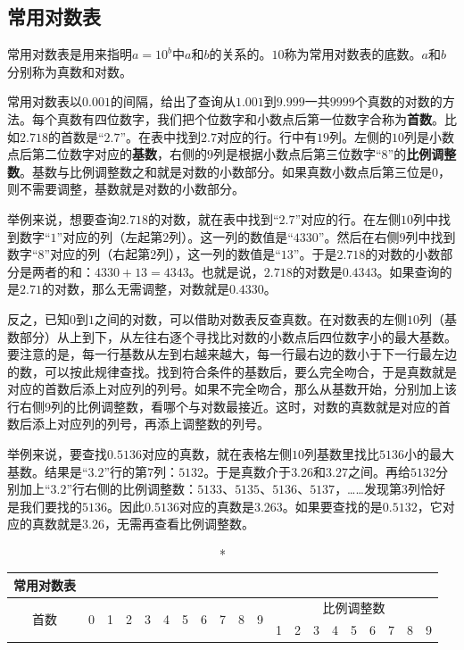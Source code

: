 \documentclass[12pt,UTF8,fontset=none]{ctexbook}
\begin{document}
\begin{appendix}

\chapter{常用对数表}

常用对数表是用来指明$a = 10^b$中$a$和$b$的关系的。$10$称为常用对数表的底数。$a$和$b$分别称为真数和对数。

常用对数表以$0.001$的间隔，给出了查询从$1.001$到$9.999$一共$9999$个真数的对数的方法。每个真数有四位数字，我们把个位数字和小数点后第一位数字合称为\textbf{首数}。比如$2.718$的首数是“$2.7$”。在表中找到$2.7$对应的行。行中有$19$列。左侧的$10$列是小数点后第二位数字对应的\textbf{基数}，右侧的$9$列是根据小数点后第三位数字“$8$”的\textbf{比例调整数}。基数与比例调整数之和就是对数的小数部分。如果真数小数点后第三位是$0$，则不需要调整，基数就是对数的小数部分。

举例来说，想要查询$2.718$的对数，就在表中找到“$2.7$”对应的行。在左侧$10$列中找到数字“$1$”对应的列（左起第$2$列）。这一列的数值是“$4330$”。然后在右侧$9$列中找到数字“$8$”对应的列（右起第$2$列），这一列的数值是“$13$”。于是$2.718$的对数的小数部分是两者的和：$4330 + 13 = 4343$。也就是说，$2.718$的对数是$0.4343$。如果查询的是$2.71$的对数，那么无需调整，对数就是$0.4330$。

反之，已知$0$到$1$之间的对数，可以借助对数表反查真数。在对数表的左侧$10$列（基数部分）从上到下，从左往右逐个寻找比对数的小数点后四位数字小的最大基数。要注意的是，每一行基数从左到右越来越大，每一行最右边的数小于下一行最左边的数，可以按此规律查找。找到符合条件的基数后，要么完全吻合，于是真数就是对应的首数后添上对应列的列号。如果不完全吻合，那么从基数开始，分别加上该行右侧$9$列的比例调整数，看哪个与对数最接近。这时，对数的真数就是对应的首数后添上对应列的列号，再添上调整数的列号。

举例来说，要查找$0.5136$对应的真数，就在表格左侧$10$列基数里找比$5136$小的最大基数。结果是“$3.2$”行的第$7$列：$5132$。于是真数介于$3.26$和$3.27$之间。再给$5132$分别加上“$3.2$”行右侧的比例调整数：$5133$、$5135$、$5136$、$5137$，……发现第$3$列恰好是我们要找的$5136$。因此$0.5136$对应的真数是$3.263$。如果要查找的是$0.5132$，它对应的真数就是$3.26$，无需再查看比例调整数。

\vspace{8pt}

\setlength{\tabcolsep}{2pt} %
\begin{longtable}{|c| c c c c c | c c c c c| c c c c c c c c c|}
\caption*{\textbf{常用对数表}} \\
\toprule
\multirow{2}{*}{首数} & \multirow{2}{*}{0} & \multirow{2}{*}{1} & \multirow{2}{*}{2} & \multirow{2}{*}{3} & \multirow{2}{*}{4} & \multirow{2}{*}{5} & \multirow{2}{*}{6} & \multirow{2}{*}{7} & \multirow{2}{*}{8} & \multirow{2}{*}{9} & \multicolumn{9}{c}{\phantom{啊w}比例调整数\phantom{啊w}} \\
\cline{12-20}
 &  &  &  &  &  &  &  &  &  &  & 1 & 2 & 3 & 4 & 5 & 6 & 7 & 8 & 9 \\
\midrule
\endfirsthead


\end{longtable}
\end{appendix}
\end{document}
